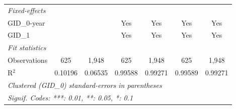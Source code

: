 \begin{tabular}{lcccccc}
   \midrule
   \emph{Fixed-effects}\\
   GID\_0-year        &              &                       & Yes                     & Yes                     & Yes                      & Yes\\  
   GID\_1             &              &                       & Yes                     & Yes                     & Yes                      & Yes\\  
   \midrule
   \emph{Fit statistics}\\
   Observations       & 625          & 1,948                 & 625                     & 1,948                   & 625                      & 1,948\\  
   R$^2$              & 0.10196      & 0.06535               & 0.99588                 & 0.99271                 & 0.99589                  & 0.99271\\  
   \midrule \midrule
   \multicolumn{7}{l}{\emph{Clustered (GID\_0) standard-errors in parentheses}}\\
   \multicolumn{7}{l}{\emph{Signif. Codes: ***: 0.01, **: 0.05, *: 0.1}}\\
\end{tabular}
\par\endgroup



